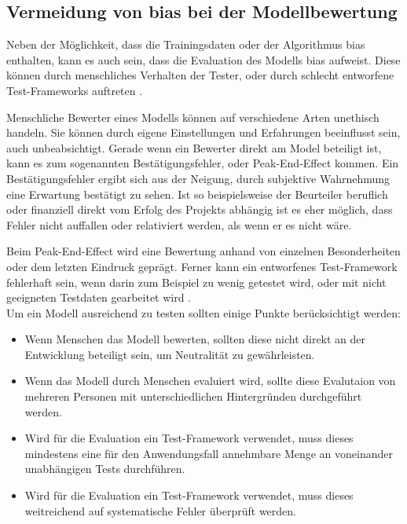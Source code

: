 \documentclass[hidelinks,12pt]{report}
\begin{document}
\subsection{Vermeidung von \Gls{bias}  bei der Modellbewertung}
Neben der Möglichkeit, dass die Trainingsdaten oder der Algorithmus \Gls{bias}  enthalten, kann es auch sein, dass die Evaluation des Modells \Gls{bias}  aufweist.
Diese können durch menschliches Verhalten der Tester, oder durch schlecht entworfene Test-Frameworks auftreten \cite[S. 54f.]{Srinivasan}.

Menschliche Bewerter eines Modells können auf verschiedene Arten unethisch handeln. Sie können durch eigene Einstellungen und Erfahrungen beeinflusst sein, auch unbeabsichtigt.
Gerade wenn ein Bewerter direkt am Model beteiligt ist, kann es zum sogenannten Bestätigungsfehler, oder \glqq Peak-End-Effect\grqq{} kommen. Ein Bestätigungsfehler ergibt sich aus der Neigung, durch subjektive Wahrnehmung eine Erwartung bestätigt zu sehen. Ist so beispielsweise der Beurteiler beruflich oder finanziell direkt vom Erfolg des Projekts abhängig ist es eher möglich, dass Fehler nicht auffallen oder relativiert werden, als wenn er es nicht wäre.

Beim \glqq Peak-End-Effect\grqq{} wird eine Bewertung anhand von einzelnen Besonderheiten oder dem letzten Eindruck geprägt.
Ferner kann ein entworfenes Test-Framework fehlerhaft sein, wenn darin zum Beispiel zu wenig getestet wird, oder mit nicht geeigneten Testdaten gearbeitet wird \cite[S. 54f.]{Srinivasan}.\\

Um ein Modell ausreichend zu testen sollten einige Punkte berücksichtigt werden: \\%
\begin{itemize}
    \item Wenn Menschen das Modell bewerten, sollten diese nicht direkt an der Entwicklung beteiligt sein, um Neutralität zu gewährleisten.
    \item Wenn das Modell durch Menschen evaluiert wird, sollte diese Evalutaion von mehreren Personen mit unterschiedlichen Hintergründen durchgeführt werden.
    \item Wird für die Evaluation ein Test-Framework verwendet, muss dieses mindestens eine für den Anwendungsfall annehmbare Menge an voneinander unabhängigen Tests durchführen.
    \item Wird für die Evaluation ein Test-Framework verwendet, muss dieses weitreichend auf systematische Fehler überprüft werden.
\end{itemize}
\end{document}
